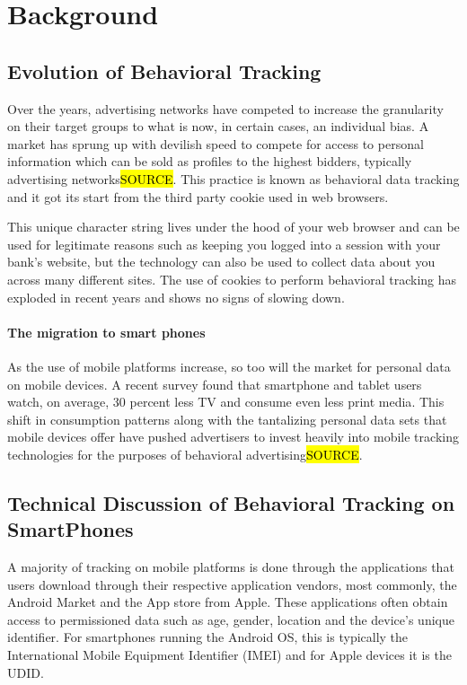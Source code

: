 \section{Background}

	\subsection{Evolution of Behavioral Tracking}

Over the years, advertising networks have competed to increase the granularity on their target groups to what is now, in certain cases, an individual bias. A market has sprung up with devilish speed to compete for access to personal information which can be sold as profiles to the highest bidders, typically advertising networks\hl{SOURCE}. This practice is known as behavioral data tracking and it got its start from the third party cookie used in web browsers.

This unique character string lives under the hood of your web browser and can be used for legitimate reasons such as keeping you logged into a session with your bank’s website, but the technology can also be used to collect data about you across many different sites. The use of cookies to perform behavioral tracking has exploded in recent years and shows no signs of slowing down\cite{Cens2012}.

		\paragraph{The migration to smart phones}
As the use of mobile platforms increase, so too will the market for personal data on mobile devices. A recent survey found that smartphone and tablet users watch, on average, 30 percent less TV and consume even less print media\cite{Abi2012}. This shift in consumption patterns along with the tantalizing personal data sets that mobile devices offer have pushed advertisers to invest heavily into mobile tracking technologies for the purposes of behavioral advertising\hl{SOURCE}.
   

	\subsection{Technical Discussion of Behavioral Tracking on SmartPhones}

A majority of tracking on mobile platforms is done through the applications that users download through their respective application vendors, most commonly, the Android Market and the App store from Apple. These applications often obtain access to permissioned data such as age, gender, location and the device’s unique identifier. For smartphones running the Android OS, this is typically the International Mobile Equipment Identifier (IMEI) and for Apple devices it is the UDID.

